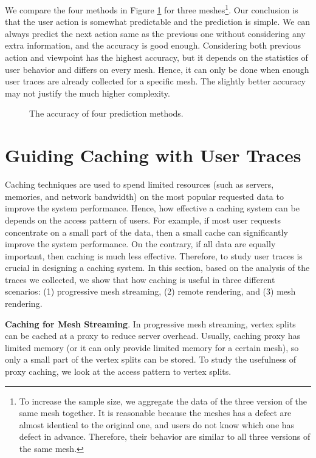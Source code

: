 We compare the four methods in Figure \ref{f:user:accuracy_comp} for three meshes\footnote{
To increase the sample size, we aggregate the data of the three version of the same mesh together.
It is reasonable because the meshes has a defect are almost identical to the original one, 
and users do not know which one has defect in advance. Therefore, their behavior are similar to
all three versions of the same mesh.}.
Our conclusion is that the user action is somewhat predictable and the prediction is simple.
We can always predict the next action same as the previous one without considering
any extra information, and the accuracy is good enough. 
Considering both previous action and viewpoint has the highest accuracy,
but it depends on the statistics of user behavior and differs on every mesh. Hence, it can only 
be done when enough user traces are already collected for a specific mesh. 
The slightly better accuracy may not justify the much higher complexity.
\begin{figure}
    \centering
    \caption{The accuracy of four prediction methods.}
    \label{f:user:accuracy_comp}
\end{figure}

\section{Guiding Caching with User Traces}
Caching techniques are used to spend limited resources (such as 
servers, memories, and network bandwidth) on the most popular requested 
data to improve the system performance. 
Hence, how effective a caching system can be depends on the access pattern
of users. For example, if most user requests concentrate on a small 
part of the data, then a small cache can significantly improve the 
system performance. On the contrary, if all data are equally important,
then caching is much less effective. Therefore, to study user traces
is crucial in designing a caching system.
In this section, based on the analysis of the traces we collected, 
we show that how caching is useful in three different scenarios:
(1) progressive mesh streaming, (2) remote rendering, and (3) 
mesh rendering.

\textbf{Caching for Mesh Streaming}.
In progressive mesh streaming, vertex splits can be cached at a proxy to reduce server overhead.
Usually, caching proxy has limited memory (or it can only provide limited memory for a certain mesh),
so only a small part of the vertex splits can be stored. To study the usefulness of proxy caching,
we look at the access pattern to vertex splits.

